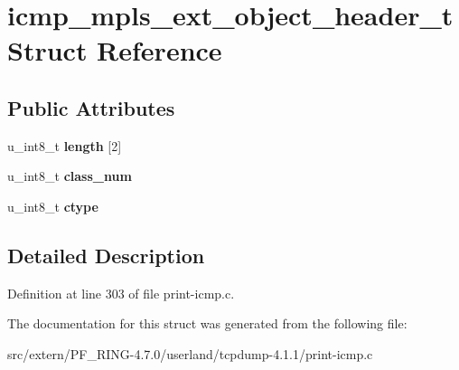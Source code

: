 \hypertarget{structicmp__mpls__ext__object__header__t}{
\section{icmp\_\-mpls\_\-ext\_\-object\_\-header\_\-t Struct Reference}
\label{structicmp__mpls__ext__object__header__t}
}
\subsection*{Public Attributes}
\begin{DoxyCompactItemize}
\item 
\hypertarget{structicmp__mpls__ext__object__header__t_afd0be3c9a6a08d9ddf89fd4f9e9cde33}{
u\_\-int8\_\-t {\bfseries length} \mbox{[}2\mbox{]}}
\label{structicmp__mpls__ext__object__header__t_afd0be3c9a6a08d9ddf89fd4f9e9cde33}

\item 
\hypertarget{structicmp__mpls__ext__object__header__t_af4c9f90a77c141d01dc0b0db04d097db}{
u\_\-int8\_\-t {\bfseries class\_\-num}}
\label{structicmp__mpls__ext__object__header__t_af4c9f90a77c141d01dc0b0db04d097db}

\item 
\hypertarget{structicmp__mpls__ext__object__header__t_add5512fa38a97d15a07f5e9e3a91b16e}{
u\_\-int8\_\-t {\bfseries ctype}}
\label{structicmp__mpls__ext__object__header__t_add5512fa38a97d15a07f5e9e3a91b16e}

\end{DoxyCompactItemize}


\subsection{Detailed Description}


Definition at line 303 of file print-\/icmp.c.



The documentation for this struct was generated from the following file:\begin{DoxyCompactItemize}
\item 
src/extern/PF\_\-RING-\/4.7.0/userland/tcpdump-\/4.1.1/print-\/icmp.c\end{DoxyCompactItemize}
